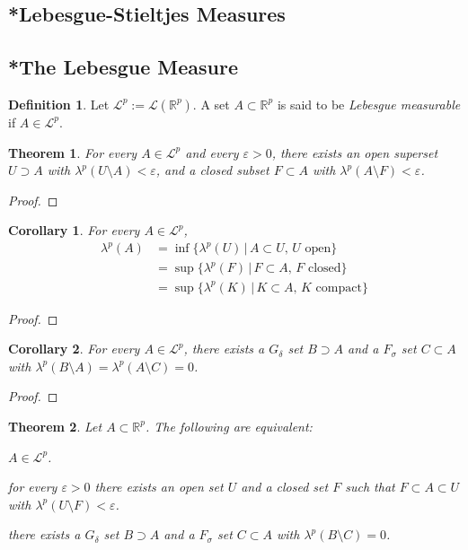 \documentclass[11pt, a4paper, openany]{book}
\newtheorem{thm}{Theorem}\newtheorem{lem}{Lemma}\newtheorem{crl}{Corollary}
\theoremstyle{definition}
\newtheorem{define}{Definition}\newtheorem{exam}{Example}\newtheorem{remark}{Remark}
\newenvironment{tight_enumerate}{\begin{enumerate}\itemsep -0.2em}{\end{enumerate}}
\begin{document}
\subsection{*Lebesgue-Stieltjes Measures}
\subsection{*The Lebesgue Measure}
    \begin{define}
        Let $\mathscr{L}^p:=\mathscr{L}(\mathbb{R}^p)$. A set $A\subset\mathbb{R}^p$ is said to be \textit{Lebesgue measurable} if $A\in\mathscr{L}^p$.
    \end{define}
    \begin{thm}
        For every $A\in\mathscr{L}^p$ and every $\varepsilon>0$, there exists an open superset $U\supset A$ with $\lambda^p(U\setminus A)<\varepsilon$, and a closed subset $F\subset A$ with $\lambda^p(A\setminus F)<\varepsilon$.
    \end{thm}
    \begin{proof}
        
    \end{proof}
    \begin{crl}
        For every $A\in\mathscr{L}^p$,
        \begin{align*}
            \lambda^p(A)&=\inf\{\lambda^p(U)\,|\,A\subset U,\, U\text{ open}\}\\
            &=\sup\{\lambda^p(F)\,|\, F\subset A,\, F\text{ closed}\}\\
            &=\sup\{\lambda^p(K)\,|\, K\subset A,\,K\text{ compact}\}
        \end{align*}
    \end{crl}
    \begin{proof}
        
    \end{proof}
    \begin{crl}
        For every $A\in\mathscr{L}^p$, there exists a $G_\delta$ set $B\supset A$ and a $F_\sigma$ set $C\subset A$ with $\lambda^p(B\setminus A)=\lambda^p(A\setminus C)=0$. 
    \end{crl}
    \begin{proof}
        
    \end{proof}
    \begin{thm}
        Let $A\subset \mathbb{R}^p$. The following are equivalent:
        \begin{tight_enumerate}
            \item $A\in\mathscr{L}^p$.
            \item for every $\varepsilon>0$ there exists an open set $U$ and a closed set $F$ such that $F\subset A\subset U$ with $\lambda^p(U\setminus F)<\varepsilon$.
            \item there exists a $G_\delta$ set $B\supset A$ and a $F_\sigma$ set $C\subset A$ with $\lambda^p(B\setminus C)=0$.
        \end{tight_enumerate}
    \end{thm}
\end{document}

